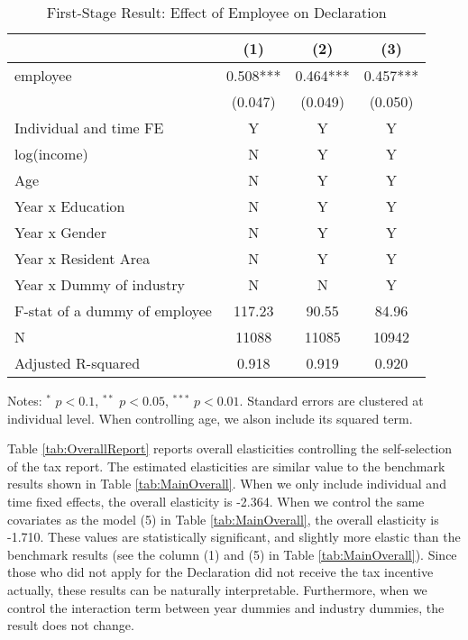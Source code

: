 \documentclass[
  11pt,
  a4paper,
]{article}
\begin{document}
\begin{table}

\caption{\label{tab:stage1Report}First-Stage Result: Effect of Employee on Declaration}
\centering
\fontsize{9}{11}\selectfont
\begin{threeparttable}
\begin{tabular}[t]{lccc}
\toprule
 & (1) & (2) & (3)\\
\midrule
employee & 0.508*** & 0.464*** & 0.457***\\
 & (0.047) & (0.049) & (0.050)\\
Individual and time FE & Y & Y & Y\\
log(income) & N & Y & Y\\
Age & N & Y & Y\\
Year x Education & N & Y & Y\\
Year x Gender & N & Y & Y\\
Year x Resident Area & N & Y & Y\\
Year x Dummy of industry & N & N & Y\\
F-stat of a dummy of employee & 117.23 & 90.55 & 84.96\\
N & 11088 & 11085 & 10942\\
Adjusted R-squared & 0.918 & 0.919 & 0.920\\
\bottomrule
\end{tabular}
\begin{tablenotes}
\item Notes: $^{*}$ $p < 0.1$, $^{**}$ $p < 0.05$, $^{***}$ $p < 0.01$. Standard errors are clustered at individual level. When controlling age, we alson include its squared term.
\end{tablenotes}
\end{threeparttable}
\end{table}

Table \ref{tab:OverallReport} reports overall elasticities controlling the self-selection of the tax report.
The estimated elasticities are similar value to the benchmark results shown in Table \ref{tab:MainOverall}.
When we only include individual and time fixed effects, the overall elasticity is -2.364.
When we control the same covariates as the model (5) in Table \ref{tab:MainOverall},
the overall elasticity is -1.710.
These values are statistically significant,
and slightly more elastic than the benchmark results
(see the column (1) and (5) in Table \ref{tab:MainOverall}).
Since those who did not apply for the Declaration did not receive the tax incentive actually,
these results can be naturally interpretable.
Furthermore, when we control the interaction term between year dummies and industry dummies,
the result does not change.
\end{document}
